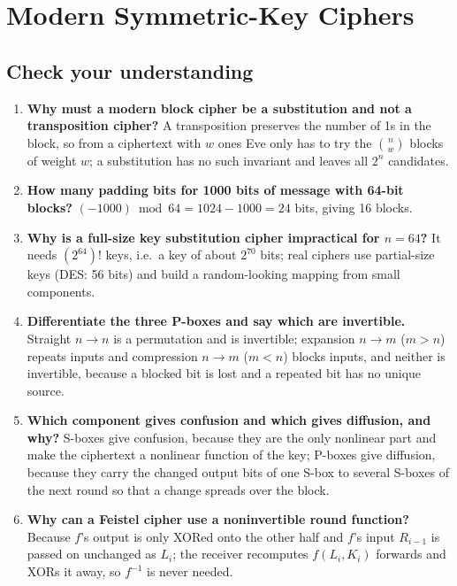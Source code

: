 \section{Modern Symmetric-Key Ciphers}\label{q:14_modern_block}

\subsection*{Check your understanding}
\begin{enumerate}[leftmargin=1.5em,itemsep=2pt]
  \item \textbf{Why must a modern block cipher be a substitution and not a transposition cipher?} A transposition preserves the number of 1s in the block, so from a ciphertext with $w$ ones Eve only has to try the $\binom{n}{w}$ blocks of weight $w$; a substitution has no such invariant and leaves all $2^n$ candidates.
  \item \textbf{How many padding bits for 1000 bits of message with 64-bit blocks?} $(-1000) \bmod 64 = 1024 - 1000 = 24$ bits, giving 16 blocks.
  \item \textbf{Why is a full-size key substitution cipher impractical for $n = 64$?} It needs $(2^{64})!$ keys, i.e.\ a key of about $2^{70}$ bits; real ciphers use partial-size keys (DES: 56 bits) and build a random-looking mapping from small components.
  \item \textbf{Differentiate the three P-boxes and say which are invertible.} Straight $n \to n$ is a permutation and is invertible; expansion $n \to m$ ($m > n$) repeats inputs and compression $n \to m$ ($m < n$) blocks inputs, and neither is invertible, because a blocked bit is lost and a repeated bit has no unique source.
  \item \textbf{Which component gives confusion and which gives diffusion, and why?} S-boxes give confusion, because they are the only nonlinear part and make the ciphertext a nonlinear function of the key; P-boxes give diffusion, because they carry the changed output bits of one S-box to several S-boxes of the next round so that a change spreads over the block.
  \item \textbf{Why can a Feistel cipher use a noninvertible round function?} Because $f$'s output is only XORed onto the other half and $f$'s input $R_{i-1}$ is passed on unchanged as $L_i$; the receiver recomputes $f(L_i, K_i)$ forwards and XORs it away, so $f^{-1}$ is never needed.

\end{enumerate}
